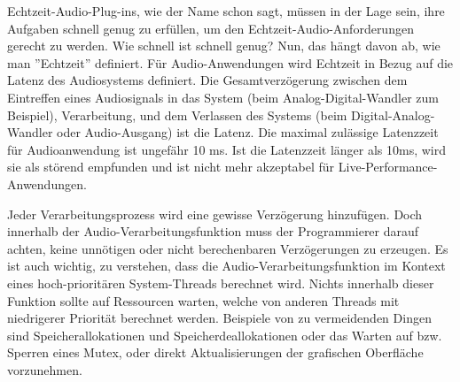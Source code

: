 Echtzeit-Audio-Plug-ins, wie der Name schon sagt, müssen in der Lage sein, ihre Aufgaben schnell genug zu erfüllen, um den Echtzeit-Audio-Anforderungen gerecht zu werden. Wie schnell ist schnell genug? Nun, das hängt davon ab, wie man ”Echtzeit” definiert. Für Audio-Anwendungen wird Echtzeit in Bezug auf die Latenz des Audiosystems definiert. Die Gesamtverzögerung zwischen dem Eintreffen eines Audiosignals in das System (beim Analog-Digital-Wandler zum Beispiel), Verarbeitung, und dem Verlassen des Systems (beim Digital-Analog-Wandler oder Audio-Ausgang) ist die Latenz. Die maximal zulässige Latenzzeit für Audioanwendung ist ungefähr 10 ms\cite{AES67-2013}. Ist die Latenzzeit länger als 10ms, wird sie  als störend empfunden und ist nicht mehr akzeptabel für Live-Performance-Anwendungen.

Jeder Verarbeitungsprozess wird eine gewisse Verzögerung hinzufügen. Doch innerhalb der Audio-Verarbeitungsfunktion muss der Programmierer darauf achten, keine unnötigen oder nicht berechenbaren Verzögerungen zu erzeugen. Es ist auch wichtig, zu verstehen, dass die Audio-Verarbeitungsfunktion im Kontext eines hoch-prioritären System-Threads berechnet wird. Nichts innerhalb dieser Funktion sollte auf Ressourcen warten, welche von anderen Threads mit niedrigerer Priorität berechnet werden. Beispiele von zu vermeidenden Dingen sind Speicherallokationen und Speicherdeallokationen oder das Warten auf bzw. Sperren eines Mutex\cite{realtime-architectures}, oder direkt Aktualisierungen der grafischen Oberfläche vorzunehmen.